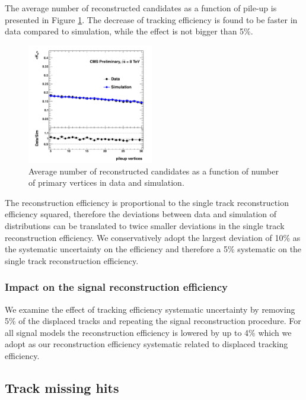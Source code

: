 The average number of 
reconstructed \Kshort candidates as a function of pile-up is presented in Figure \ref{fig:kspileup}. 
The decrease of tracking efficiency is found to be faster in data compared to simulation, while the 
effect is not bigger than 5\%.

\begin{figure}[htbp]
\centering
\includegraphics[width=0.49\textwidth]{plots/kshort/effnPV.pdf}
\caption{Average number of reconstructed \Kshort candidates as a function of number of primary vertices in data and simulation. \label{fig:kspileup}}
\end{figure}

The \Kshort reconstruction efficiency is proportional to the single track reconstruction efficiency squared, 
therefore the deviations between data and simulation of \Kshort distributions can be translated to twice smaller 
deviations in the single track reconstruction efficiency. We conservatively adopt the largest deviation 
of 10\% as the systematic uncertainty on the \Kshort efficiency and therefore a 5\% systematic on the 
single track reconstruction efficiency. 

\subsubsection{Impact on the signal reconstruction efficiency}

We examine the effect of tracking efficiency systematic uncertainty by removing 5\% of the displaced tracks 
 and repeating the signal reconstruction procedure.
For all signal models the reconstruction efficiency is lowered by up to 4\% which we adopt as our reconstruction
efficiency systematic related to displaced tracking efficiency.  

\subsection{Track missing hits}

